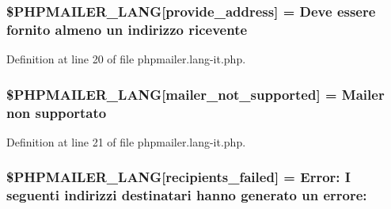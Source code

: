 \subsubsection[{\texorpdfstring{\$\+P\+H\+P\+M\+A\+I\+L\+E\+R\+\_\+\+L\+A\+NG}{$PHPMAILER_LANG}}]{\setlength{\rightskip}{0pt plus 5cm}\$P\+H\+P\+M\+A\+I\+L\+E\+R\+\_\+\+L\+A\+NG\mbox{[}\textquotesingle{}provide\+\_\+address\textquotesingle{}\mbox{]} = \textquotesingle{}Deve essere fornito almeno un indirizzo ricevente\textquotesingle{}}\hypertarget{phpmailer_8lang-it_8php_a8b97897c2406b7392b056f375feeefbb}{}\label{phpmailer_8lang-it_8php_a8b97897c2406b7392b056f375feeefbb}


Definition at line 20 of file phpmailer.\+lang-\/it.\+php.

\subsubsection[{\texorpdfstring{\$\+P\+H\+P\+M\+A\+I\+L\+E\+R\+\_\+\+L\+A\+NG}{$PHPMAILER_LANG}}]{\setlength{\rightskip}{0pt plus 5cm}\$P\+H\+P\+M\+A\+I\+L\+E\+R\+\_\+\+L\+A\+NG\mbox{[}\textquotesingle{}mailer\+\_\+not\+\_\+supported\textquotesingle{}\mbox{]} = \textquotesingle{}Mailer non supportato\textquotesingle{}}\hypertarget{phpmailer_8lang-it_8php_aa2ebcb8833ee83a7ad67401c4bb3a6ad}{}\label{phpmailer_8lang-it_8php_aa2ebcb8833ee83a7ad67401c4bb3a6ad}


Definition at line 21 of file phpmailer.\+lang-\/it.\+php.

\subsubsection[{\texorpdfstring{\$\+P\+H\+P\+M\+A\+I\+L\+E\+R\+\_\+\+L\+A\+NG}{$PHPMAILER_LANG}}]{\setlength{\rightskip}{0pt plus 5cm}\$P\+H\+P\+M\+A\+I\+L\+E\+R\+\_\+\+L\+A\+NG\mbox{[}\textquotesingle{}recipients\+\_\+failed\textquotesingle{}\mbox{]} =  Error\+: I seguenti indirizzi destinatari hanno generato un errore\+: \textquotesingle{}}\hypertarget{phpmailer_8lang-it_8php_a7589d30bb9b368327c2df015f3e6bcba}{}\label{phpmailer_8lang-it_8php_a7589d30bb9b368327c2df015f3e6bcba}


